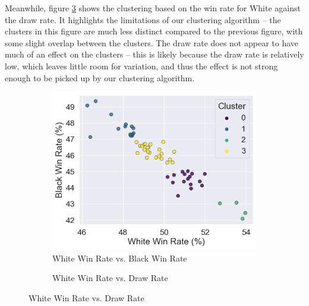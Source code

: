 \documentclass[a4paper, 11pt]{article}
\begin{document}
Meanwhile, figure \ref{fig:baseOpeningsClusteredByGameResultsWhiteVersusDraw} shows the clustering based on the win rate for White against the draw rate. It highlights the limitations of our clustering algorithm -- the clusters in this figure are much less distinct compared to the previous figure, with some slight overlap between the clusters. The draw rate does not appear to have much of an effect on the clusters -- this is likely because the draw rate is relatively low, which leaves little room for variation, and thus the effect is not strong enough to be picked up by our clustering algorithm.

\begin{figure}[H]
    \centering
    \caption{Base Openings K-Means Clustered by Game Results}
    \begin{subfigure}{0.49\textwidth}
        \centering
        \caption{White Win Rate vs. Black Win Rate}
        \label{fig:baseOpeningsClusteredByGameResultsWhiteVersusBlack}
        \includegraphics[width=\textwidth]{Base Openings Clustered by Game Results (White Win Rate vs Black Win Rate).png}
    \end{subfigure}
    \hfill
    \begin{subfigure}{0.49\textwidth}
        \centering
        \caption{White Win Rate vs. Draw Rate}
        \label{fig:baseOpeningsClusteredByGameResultsWhiteVersusDraw}

\end{subfigure}
\end{figure}
\end{document}
